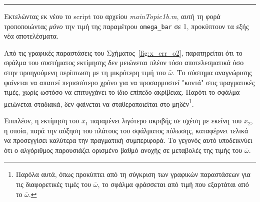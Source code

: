 \documentclass[12pt]{article} %
\numberwithin{equation}{section}  %
\begin{document}
\vspace{3pt}
\hrule
\vspace{3pt}



Εκτελώντας εκ νέου το script του αρχείου \textit{mainTopic1b.m}, αυτή τη φορά τροποποιώντας \textit{μόνο} την τιμή της παραμέτρου 
{\small \texttt{omega\_bar}} σε 1, προκύπτουν τα εξής νέα αποτελέσματα.

Από τις γραφικές παραστάσεις του Σχήματος~\ref{fig:x_err_o2}, παρατηρείται ότι το σφάλμα του συστήματος εκτίμησης δεν μειώνεται πλέον τόσο αποτελεσματικά όσο στην προηγούμενη περίπτωση με τη μικρότερη τιμή του $\bar\omega$. 
Το σύστημα αναγνώρισης φαίνεται να απαιτεί περισσότερο χρόνο για να προσαρμοστεί "κοντά" στις πραγματικές τιμές, χωρίς ωστόσο να επιτυγχάνει το ίδιο επίπεδο ακρίβειας. 
Παρότι το σφάλμα μειώνεται σταδιακά, δεν φαίνεται να σταθεροποιείται στο μηδέν\footnote{
Παρόλα αυτά,  όπως προκύπτει από τη σύγκριση των γραφικών παραστάσεων για τις διαφορετικές τιμές του $\bar\omega$, 
το σφάλμα φράσσεται από τιμή που εξαρτάται από το $\bar\omega$.
}.

Επιπλέον, η εκτίμηση του $x_1$ παραμένει λιγότερο ακριβής σε σχέση με εκείνη του $x_2$, η οποία, 
παρά την αύξηση του πλάτους του σφάλματος πόλωσης, καταφέρνει τελικά να προσεγγίσει καλύτερα την πραγματική συμπεριφορά. 
Το γεγονός αυτό υποδεικνύει ότι ο αλγόριθμος παρουσιάζει ορισμένο βαθμό ανοχής σε μεταβολές της τιμής του $\bar\omega$.
\end{document}
